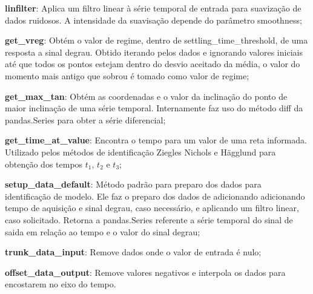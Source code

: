 \begin{alineas}
    \item \textbf{linfilter}: Aplica um filtro linear à série temporal de entrada para suavização de dados ruidosos.
    A intensidade da suavisação depende do parâmetro smoothness;
    \item \textbf{get\_vreg}: Obtém o valor de regime, dentro de settling\_time\_threshold, de uma resposta a sinal
    degrau.
    Obtido iterando pelos dados e ignorando valores iniciais até que todos os pontos estejam dentro do desvio aceitado
    da média, o valor do momento mais antigo que sobrou é tomado como valor de regime;
    \item \textbf{get\_max\_tan}: Obtém as coordenadas e o valor da inclinação do ponto de maior inclinação de uma série
    temporal.
    Internamente faz uso do método diff da pandas.Series para obter a série diferencial;
    \item \textbf{get\_time\_at\_value}: Encontra o tempo para um valor de uma reta informada.
    Utilizado pelos métodos de identificação Ziegles Nichols e Hägglund para obtenção dos tempos $t_1$, $t_2$ e $t_3$;
    \item \textbf{setup\_data\_default}: Método padrão para preparo dos dados para identificação de modelo.
    Ele faz o preparo dos dados de adicionando adicionando tempo de aquisição e sinal degrau, caso necessário,
    e aplicando um filtro linear, caso solicitado.
    Retorna a pandas.Series referente a série temporal do sinal de saida em relação ao tempo e o valor do sinal degrau;
    \item \textbf{trunk\_data\_input}: Remove dados onde o valor de entrada é nulo;
    \item \textbf{offset\_data\_output}: Remove valores negativos e interpola os dados para encostarem no eixo do tempo.
\end{alineas}

